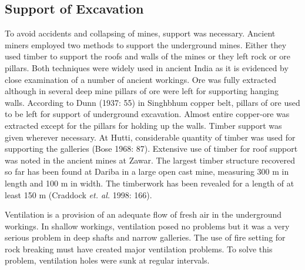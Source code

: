 \vspace{-.3cm}

\subsection*{Support of Excavation}

\vspace{-.2cm}

To avoid accidents and collapsing of mines, support was necessary. Ancient miners employed two methods to support the underground mines. Either they used timber to support the roofs and walls of the mines or they left rock or ore pillars. Both techniques were widely used in ancient India as it is evidenced by close examination of a number of ancient workings.  Ore was fully extracted although in several deep mine pillars of ore were left for supporting hanging walls. According to Dunn (1937: 55) in Singhbhum copper belt, pillars of ore used to be left for support of underground excavation. Almost entire copper-ore was extracted except for the pillars for holding up the walls. Timber support was given wherever necessary.  At Hutti, considerable quantity of timber was used for supporting the galleries (Bose 1968: 87).  Extensive use of timber for roof support was noted in the ancient mines at Zawar. The largest timber structure recovered so far has been found at Dariba in a large open cast mine, measuring 300 m in length and 100 m in width. The timberwork has been revealed for a length of at least 150 m (Craddock {\it et. al.} 1998: 166). 


Ventilation is a provision of an adequate flow of fresh air in the underground workings. In shallow workings, ventilation posed no problems but it was a very serious problem in deep shafts and narrow galleries. The use of fire setting for rock breaking must have created major ventilation problems. To solve this problem, ventilation holes were sunk at regular intervals.

